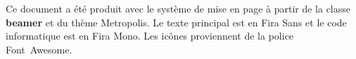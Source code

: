 \begin{frame}[plain]
  \begin{adjustwidth}{20mm}{20mm}
    \scriptsize
    \raggedright %
    Ce document a été produit avec le système de mise en page
    {\XeLaTeX} à partir de la classe \textbf{beamer} et du thème
    Metropolis. Le texte principal est en Fira Sans et le code
    informatique est en Fira Mono. Les icônes proviennent de la
    police Font~Awesome.
  \end{adjustwidth}
\end{frame}

